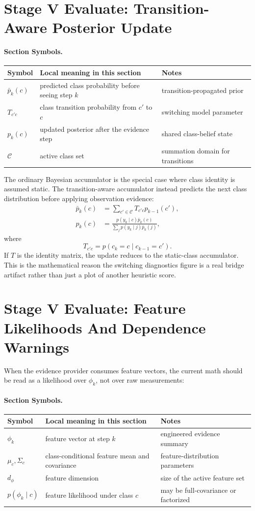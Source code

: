 \documentclass[11pt]{article}
\newcommand{\sectionsymbol}[3]{#1 & #2 & #3 \\}
\newcommand{\sectionsymbols}[1]{%
\begin{center}
\small
\setlength{\tabcolsep}{4pt}
\begin{tabularx}{0.95\textwidth}{>{\raggedright\arraybackslash}p{0.16\textwidth}X>{\raggedright\arraybackslash}p{0.18\textwidth}}
\toprule
Symbol & Local meaning in this section & Notes \\
\midrule
#1
\bottomrule
\end{tabularx}
\end{center}
}
\begin{document}
\section{Stage V Evaluate: Transition-Aware Posterior Update}
\paragraph{Section Symbols.}
\sectionsymbols{
\sectionsymbol{\(\bar{p}_k(c)\)}{predicted class probability before seeing step \(k\)}{transition-propagated prior}
\sectionsymbol{\(T_{c'c}\)}{class transition probability from \(c'\) to \(c\)}{switching model parameter}
\sectionsymbol{\(p_k(c)\)}{updated posterior after the evidence step}{shared class-belief state}
\sectionsymbol{\(\mathcal{C}\)}{active class set}{summation domain for transitions}
}

\noindent
The ordinary Bayesian accumulator is the special case where class identity is assumed static. The transition-aware accumulator instead predicts the next class distribution before applying observation evidence:
\begin{align}
\bar{p}_k(c)
&=
\sum_{c' \in \mathcal{C}} T_{c'c} p_{k-1}(c'), \\
p_k(c)
&=
\frac{p(y_k \mid c)\bar{p}_k(c)}{\sum_j p(y_k \mid j)\bar{p}_k(j)},
\end{align}
where
\begin{equation}
T_{c'c} = p(c_k = c \mid c_{k-1} = c').
\end{equation}
If \(T\) is the identity matrix, the update reduces to the static-class accumulator. This is the mathematical reason the switching diagnostics figure is a real bridge artifact rather than just a plot of another heuristic score.

\section{Stage V Evaluate: Feature Likelihoods And Dependence Warnings}
When the evidence provider consumes feature vectors, the current math should be read as a likelihood over \(\phi_k\), not over raw measurements:
\paragraph{Section Symbols.}
\sectionsymbols{
\sectionsymbol{\(\phi_k\)}{feature vector at step \(k\)}{engineered evidence summary}
\sectionsymbol{\(\mu_c, \Sigma_c\)}{class-conditional feature mean and covariance}{feature-distribution parameters}
\sectionsymbol{\(d_\phi\)}{feature dimension}{size of the active feature set}
\sectionsymbol{\(p(\phi_k \mid c)\)}{feature likelihood under class \(c\)}{may be full-covariance or factorized}
}
\end{document}
